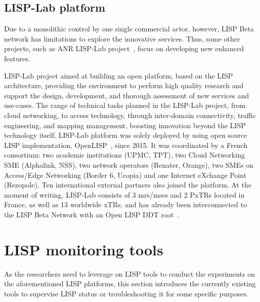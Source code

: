 \subsection{LISP-Lab platform}
\label{subsec:platform_lab}
Due to a monolithic control by one single commercial actor, however, LISP Beta network has limitations to explore the innovative services. Thus, some other projects, such as ANR LISP-Lab project~\cite{lisplab}, focus on developing new enhanced features.

LISP-Lab project aimed at building an open platform, based on the LISP architecture, providing the environment to perform high quality research and support the design, development, and thorough assessment of new services and use-cases. The range of technical tasks planned in the LISP-Lab project, from cloud networking, to access technology, through inter-domain connectivity, traffic engineering, and mapping management, boosting innovation beyond the LISP technology itself. LISP-Lab platform was solely deployed by using open source LISP implementation, OpenLISP~\cite{OpenLISP}, since 2015. %
It was coordinated by a French consortium: two academic institutions (UPMC, TPT), two Cloud Networking SME (Alphalink, NSS), two network operators (Renater, Orange), two SMEs on Access/Edge Networking (Border 6, Ucopia) and one Internet eXchange Point (Rezopole). Ten international external partners also joined the platform. At the moment of writing, LISP-Lab consists of 3 \acrshort{mr}s/\acrshort{ms}es and 2 PxTRs located in France, as well as 13 worldwide xTRs, and has already been interconnected to the LISP Beta Network with an Open LISP DDT root~\cite{fuller2012lisp}.


\section{LISP monitoring tools}
\label{sec:monitor}
As the researchers need to leverage on LISP tools to conduct the experiments on the aforementioned LISP platforms, this section introduces the currently existing tools to supervise LISP status or troubleshooting it for some specific purposes. %

